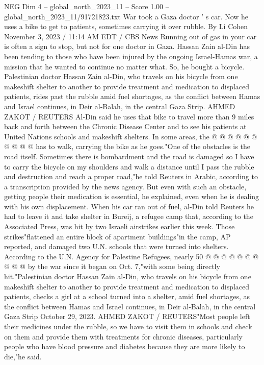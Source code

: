\begin{textsample}{NEG Dim 4 – global\_north\_2023\_11 – Score 1.00 – global\_north\_2023\_11/91721823.txt}  \label{ex:f4_neg_189}
War took a Gaza doctor ' s car.
Now he uses a bike to get to patients, sometimes carrying it over rubble.
By Li Cohen November 3, 2023 / 11:14 AM EDT / CBS News Running out of gas in your car is often a sign to stop, but not for one doctor in Gaza.
Hassan Zain al-Din has been tending to those who have been injured by the ongoing Israel-Hamas war, a mission that he wanted to continue no matter what.
So, he bought a bicycle.
Palestinian doctor Hassan Zain al-Din, who travels on his bicycle from one makeshift shelter to another to provide treatment and medication to displaced patients, rides past the rubble amid fuel shortages, as the conflict between Hamas and Israel continues, in Deir al-Balah, in the central Gaza Strip.
AHMED ZAKOT / REUTERS Al-Din said he uses that bike to travel more than 9 miles back and forth between the Chronic Disease Center and to see his patients at United Nations schools and makeshift shelters.
In some areas, the @ @ @ @ @ @ @ @ @ @ has to walk, carrying the bike as he goes."One of the obstacles is the road itself.
Sometimes there is bombardment and the road is damaged so I have to carry the bicycle on my shoulders and walk a distance until I pass the rubble and destruction and reach a proper road,"he told Reuters in Arabic, according to a transcription provided by the news agency.
But even with such an obstacle, getting people their medication is essential, he explained, even when he is dealing with his own displacement.
When his car ran out of fuel, al-Din told Reuters he had to leave it and take shelter in Bureij, a refugee camp that, according to the Associated Press, was hit by two Israeli airstrikes earlier this week.
Those strikes"flattened an entire block of apartment buildings"in the camp, AP reported, and damaged two U.N. schools that were turned into shelters.
According to the U.N.
Agency for Palestine Refugees, nearly 50 @ @ @ @ @ @ @ @ @ @ by the war since it began on Oct. 7,"with some being directly hit."Palestinian doctor Hassan Zain al-Din, who travels on his bicycle from one makeshift shelter to another to provide treatment and medication to displaced patients, checks a girl at a school turned into a shelter, amid fuel shortages, as the conflict between Hamas and Israel continues, in Deir al-Balah, in the central Gaza Strip October 29, 2023.
AHMED ZAKOT / REUTERS"Most people left their medicines under the rubble, so we have to visit them in schools and check on them and provide them with treatments for chronic diseases, particularly people who have blood pressure and diabetes because they are more likely to die,"he said.

\end{textsample}

